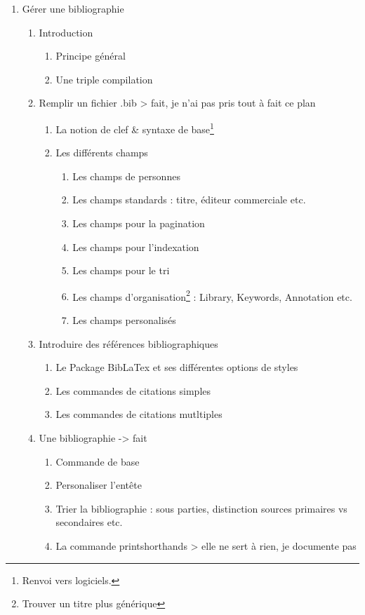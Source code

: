 \begin{enumerate}
\item{Gérer une bibliographie}
\begin{enumerate}
\item Introduction
	\begin{enumerate}
		\item{Principe général}
		\item{Une triple compilation}
	\end{enumerate}
\item Remplir un fichier .bib 						> fait, je n'ai pas pris tout à fait ce plan
	\begin{enumerate}
	\item La notion de clef \& syntaxe de base\footnote{Renvoi vers logiciels.}
	\item Les différents champs
		\begin{enumerate}
			\item Les champs de personnes
			\item Les champs standards : titre, éditeur commerciale etc.
			\item Les champs pour la pagination
			\item Les champs pour l'indexation
			\item Les champs pour le tri
			\item Les champs d'organisation\footnote{Trouver un titre plus générique} : Library, Keywords, Annotation etc.
			\item Les champs personalisés
		\end{enumerate} 
	\end{enumerate}
\item{Introduire des références bibliographiques}
	\begin{enumerate}
	\item Le Package BibLaTex et ses différentes options de styles
	\item Les commandes de citations simples
	\item Les commandes de citations mutltiples
	\end{enumerate}
\item Une bibliographie							-> fait
	\begin{enumerate}
	\item Commande de base
	\item Personaliser l'entête
	\item Trier la bibliographie : sous parties, distinction sources primaires vs secondaires etc.
	\item La commande printshorthands				> elle ne sert à rien, je documente pas
	\end{enumerate}


\end{enumerate}
\end{enumerate}
